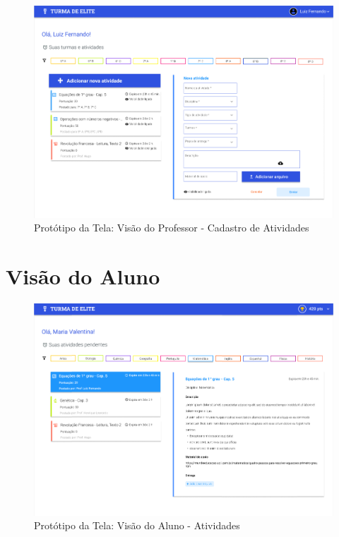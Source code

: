 \begin{apendicesenv}
\begin{figure}[htb]
    \centering
	\includegraphics[width=16cm]{imagens/Professor-CadastroAtividades.png}
	\caption{\label{fig:professor} Protótipo da Tela: Visão do Professor - Cadastro de Atividades}
\end{figure}
\FloatBarrier


\section{Visão do Aluno}

\begin{figure}[htb]
    \centering
	\includegraphics[width=16cm]{imagens/Aluno-Atividades.png}
	\caption{\label{fig:aluno} Protótipo da Tela: Visão do Aluno - Atividades}
\end{figure}
\FloatBarrier


\end{apendicesenv}
